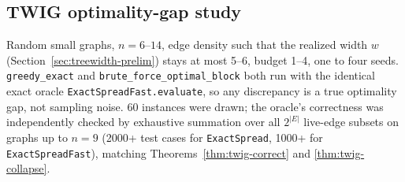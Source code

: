 \documentclass[ASNA,number]{USG}
\begin{document}
\subsection{TWIG optimality-gap study}
Random small graphs, $n=6$--$14$, edge density such that the realized
width $w$ (Section~\ref{sec:treewidth-prelim}) stays at most 5--6, budget
1--4, one to four seeds. \texttt{greedy\_exact} and
\texttt{brute\_force\_optimal\_block} both run with the identical exact
oracle \texttt{ExactSpreadFast.evaluate}, so any discrepancy is a true
optimality gap, not sampling noise. 60 instances were drawn; the oracle's
correctness was independently checked by exhaustive summation over all
$2^{|E|}$ live-edge subsets on graphs up to $n=9$ (2000+ test cases for
\texttt{ExactSpread}, 1000+ for \texttt{ExactSpreadFast}), matching
Theorems~\ref{thm:twig-correct} and \ref{thm:twig-collapse}.
\end{document}
